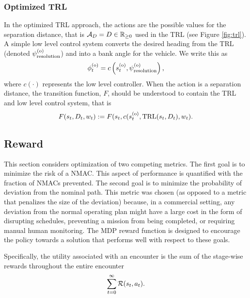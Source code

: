 \subsubsection{Optimized TRL}

In the optimized TRL approach, the actions are the possible values for the separation distance, that is ${\mathcal{A}}_{D} = D\in \mathbb{R}_{\geq 0}$ used in the TRL (see Figure \ref{fig:trl}).
A simple low level control system converts the desired heading from the TRL (denoted $\psi^{(\mathrm{o})}_\mathrm{resolution}$) and into a bank angle for the vehicle.
We write this as
\begin{equation}
    \phi^{(\mathrm{o})}_t = c\left(s^{(\mathrm{o})}_t, \psi^{(\mathrm{o})}_\mathrm{resolution} \right) \text{,}
\end{equation}
where $c(\cdot)$ represents the low level controller.
When the action is a separation distance, the transition function, $F$, should be understood to contain the TRL and low level control system, that is
\begin{equation}
    F(s_t, D_t, w_t) := F(s_t, c(s^{(\mathrm{o})}_t, \text{TRL}(s_t, D_t), w_t) \text{.}
\end{equation}

\subsection{Reward}\label{sec:rew}

This section considers optimization of two competing metrics. The first goal is to minimize the risk of a NMAC. This aspect of performance is quantified with the fraction of NMACs prevented. The second goal is to minimize the probability of deviation from the nominal path. This metric was chosen (as opposed to a metric that penalizes the size of the deviation) because, in a commercial setting, any deviation from the normal operating plan might have a large cost in the form of disrupting schedules, preventing a mission from being completed, or requiring manual human monitoring. The MDP reward function is designed to encourage the policy towards a solution that performs well with respect to these goals.  

Specifically, the utility associated with an encounter is the sum of the stage-wise rewards throughout  the entire encounter
\begin{equation}\label{eqn:encrew}
    \sum_{t=0}^\infty \mathcal{R}(s_t, a_t) \text{.}
\end{equation}


